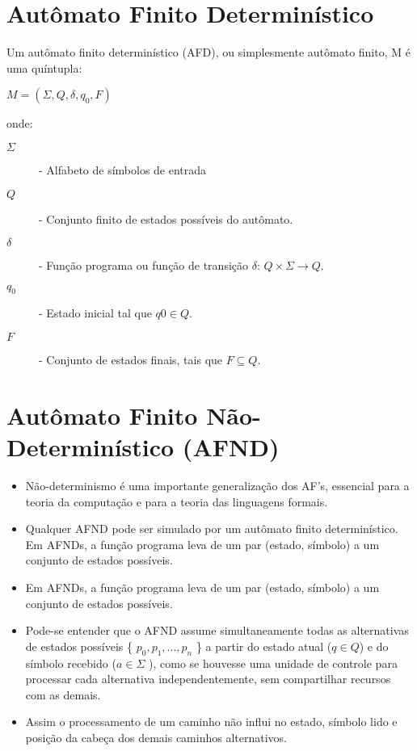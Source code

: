 \documentclass[10pt,a4paper,titlepage]{hitec}
\begin{document}
\section*{Autômato Finito Determinístico}

Um autômato finito determinístico (AFD), ou simplesmente autômato finito, M é uma
quíntupla:
\bigskip

\begin{center}
$M = (\Sigma,Q,\delta,q_0,F)$
\end{center}

onde:

\begin{description}
\item[$\Sigma$] - Alfabeto de símbolos de entrada 
\item[$Q$] - Conjunto finito de estados possíveis do autômato.
\item[$\delta$] - Função programa ou função de transição $\delta$: $Q \times \Sigma \rightarrow Q$.
\item[$q_0$] - Estado inicial tal que $q0 \in Q$.
\item[$F$] - Conjunto de estados finais, tais que $F \subseteq Q$.
\end{description}

\section*{Autômato Finito Não-Determinístico (AFND)}

\begin{itemize}
\item Não-determinismo é uma importante generalização dos AF's, essencial para a teoria da computação e para a teoria das linguagens formais.
\item Qualquer AFND pode ser simulado por um autômato finito determinístico.
Em AFNDs, a função programa leva de um par (estado, símbolo) a um conjunto de estados possíveis.
\item Em AFNDs, a função programa leva de um par (estado, símbolo) a um conjunto
de estados possíveis.
\item Pode-se entender que o AFND assume simultaneamente todas as alternativas de
estados possíveis \{ $p_0, p_1, ..., p_n$ \} a partir do estado atual ($q \in Q$) e do símbolo
recebido ($a \in \Sigma $ ), como se houvesse uma unidade de controle para processar
cada alternativa independentemente, sem compartilhar recursos com as demais.
\item Assim o processamento de um caminho não influi no estado, símbolo lido e
posição da cabeça dos demais caminhos alternativos.
\end{itemize}
\end{document}
